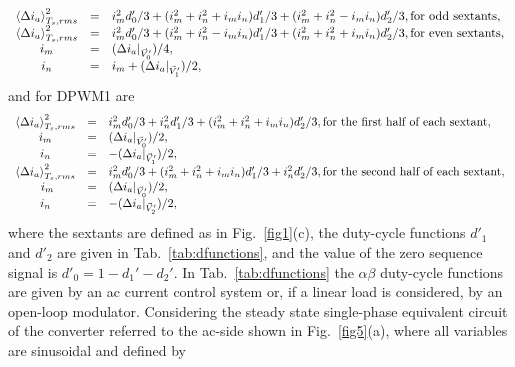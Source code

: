 \documentclass[10pt, onecolumn,conference]{IEEEtran}
\begin{document}
%
\begin{equation}
\begin{array}{c c l}
 \left\langle \Delta i_a \right \rangle_{T_s,rms}^2 &=& i_m^2d_0'/3 +(i_m^2+i_n^2+i_mi_n)d_1'/3+ (i_m^2+i_n^2-i_mi_n)d_2'/3, \textrm{for odd sextants},\\
 \left\langle \Delta i_a \right \rangle_{T_s,rms}^2 &=& i_m^2d_0'/3 +(i_m^2+i_n^2-i_mi_n)d_1'/3+ (i_m^2+i_n^2+i_mi_n)d_2'/3, \textrm{for even sextants},\\
 i_m&=&(\Delta i_a|_{\vec{V}'_0})/4,\\
 i_n&=&i_m+(\Delta i_a|_{\vec{V}'_1})/2,\\
\end{array}
\end{equation} and for DPWM1 are
\begin{equation}
\begin{array}{c c l}
 \left\langle \Delta i_a \right \rangle_{T_s,rms}^2 &=& i_m^2d_0'/3 +i_n^2d_1'/3+ (i_m^2+i_n^2+i_mi_n)d_2'/3, \textrm{for the first half of each sextant},\\
 i_m&=&(\Delta i_a|_{\vec{V}'_0})/2,\\
 i_n&=&-(\Delta i_a|_{\vec{V}'_1})/2,\\
 \left\langle \Delta i_a \right \rangle_{T_s,rms}^2 &=& i_m^2d_0'/3 +(i_m^2+i_n^2+i_mi_n)d_1'/3+ i_n^2d_2'/3, \textrm{for the second half of each sextant},\\\
 i_m&=&(\Delta i_a|_{\vec{V}'_0})/2,\\
 i_n&=&-(\Delta i_a|_{\vec{V}'_2})/2,\\
\end{array}
\end{equation} where the sextants are defined as in Fig.~\ref{fig1}(c), the duty-cycle functions $d'_1$ and $d'_2$ are given in Tab.~\ref{tab:dfunctions}, and the value of the zero sequence signal is $d'_0\!=\!1\!-\!d_1'\!-\!d_2'$.	In Tab.~\ref{tab:dfunctions} the $\alpha\beta$ duty-cycle functions are given by an ac current control system or, if  a linear load is considered, by an open-loop modulator.  {Considering the steady state single-phase equivalent  circuit of the converter referred to the ac-side shown in Fig.~\ref{fig5}(a), where all variables are sinusoidal and defined by}
\end{document}
